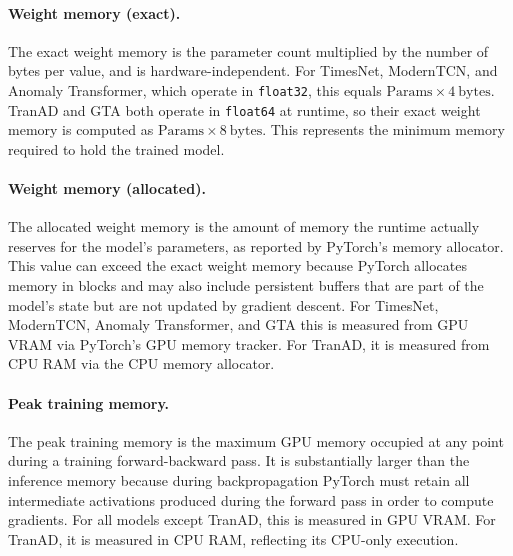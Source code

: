 \documentclass[twoside,11pt,openright]{report}
\begin{document}
\paragraph{Weight memory (exact).}
The exact weight memory is the parameter count multiplied by the number of bytes per
value, and is hardware-independent. For TimesNet, ModernTCN, and Anomaly Transformer, 
which operate in \texttt{float32}, this equals $\mathrm{Params} \times 4\ \mathrm{bytes}$. 
TranAD and GTA both operate in \texttt{float64} at runtime, so their exact weight memory is computed as 
$\mathrm{Params} \times 8\ \mathrm{bytes}$. This represents the minimum memory required 
to hold the trained model.

\paragraph{Weight memory (allocated).}
The allocated weight memory is the amount of memory the runtime actually
reserves for the model's parameters, as reported by PyTorch's memory allocator. This
value can exceed the exact weight memory because PyTorch allocates memory in blocks
and may also include persistent buffers that are part of the model's state but are not updated by
gradient descent. For TimesNet, ModernTCN, Anomaly Transformer, and GTA 
this is measured from GPU VRAM via PyTorch's GPU memory tracker. For TranAD, it is 
measured from CPU RAM via the CPU memory allocator.

\paragraph{Peak training memory.}
The peak training memory is the maximum GPU memory occupied at any point during a
training forward-backward pass. It is substantially larger than the inference memory
because during backpropagation PyTorch must retain all intermediate activations
produced during the forward pass in order to compute gradients.
For all models except TranAD, this is measured in GPU VRAM. For TranAD, it is measured 
in CPU RAM, reflecting its CPU-only execution.
\end{document}

